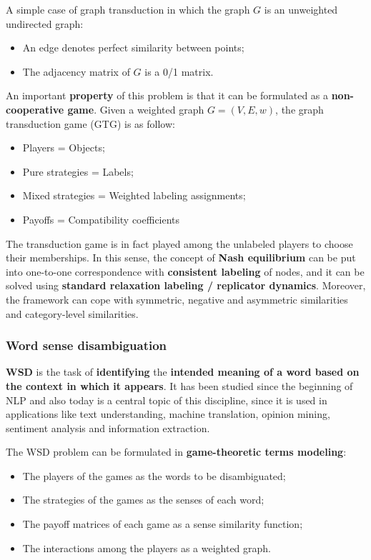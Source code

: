 A simple case of graph transduction in which the graph $G$ is an unweighted undirected graph:

\begin{itemize}
    \item An edge denotes perfect similarity between points;
    \item The adjacency matrix of $G$ is a 0/1 matrix.
\end{itemize}

An important \textbf{property} of this problem is that it can be formulated as a \textbf{non-cooperative game}. Given a weighted graph $G = (V,E,w)$, the graph transduction game (GTG) is as follow:

\begin{itemize}
    \item Players = Objects;
    \item Pure strategies = Labels;
    \item Mixed strategies = Weighted labeling assignments;
    \item Payoffs = Compatibility coefficients
\end{itemize}

The transduction game is in fact played among the unlabeled players to choose
their memberships. In this sense, the concept of \textbf{Nash equilibrium} can be put into one-to-one correspondence with \textbf{consistent labeling} of nodes, and it can be solved using\textbf{ standard relaxation labeling / replicator dynamics}. Moreover, the framework can cope with symmetric, negative and asymmetric similarities and category-level similarities.

\subsubsection{Word sense disambiguation}
\textbf{WSD} is the task of \textbf{identifying} the \textbf{intended meaning of a word based on the context in which it appears}. It has been studied since the beginning of NLP and also today is a central topic of this discipline, since it is used in applications like text understanding, machine translation, opinion mining, sentiment analysis and information extraction.

The WSD problem can be formulated in \textbf{game-theoretic terms modeling}:

\begin{itemize}
    \item The players of the games as the words to be disambiguated;
    \item The strategies of the games as the senses of each word;
    \item The payoff matrices of each game as a sense similarity function;
    \item The interactions among the players as a weighted graph.
\end{itemize}

